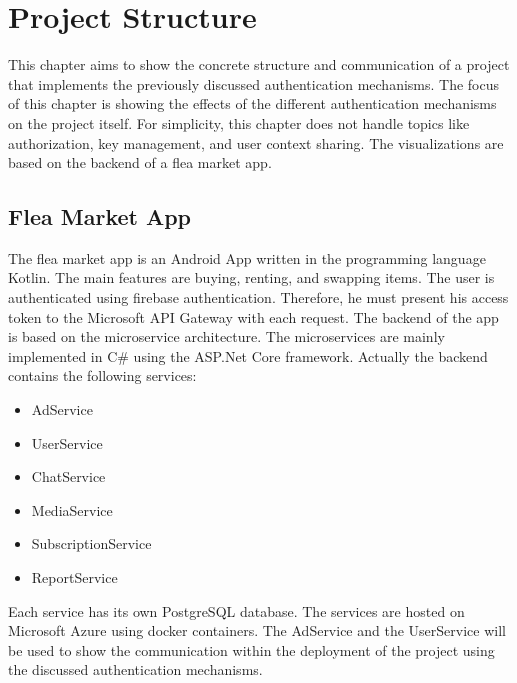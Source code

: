 \chapter{Project Structure}
\label{cha:project_structure}
This chapter aims to show the concrete structure and communication of a project that implements the previously discussed authentication mechanisms.
The focus of this chapter is showing the effects of the different authentication mechanisms on the project itself.
For simplicity, this chapter does not handle topics like authorization, key management, and user context sharing.
The visualizations are based on the backend of a flea market app.

\section{Flea Market App}
The flea market app is an Android App written in the programming language Kotlin.
The main features are buying, renting, and swapping items.
The user is authenticated using firebase authentication.
Therefore, he must present his access token to the Microsoft API Gateway with each request.
The backend of the app is based on the microservice architecture.
The microservices are mainly implemented in C\# using the ASP.Net Core framework.
Actually the backend contains the following services:
\begin{itemize}
	\item AdService
	\item UserService
	\item ChatService
	\item MediaService
	\item SubscriptionService
	\item ReportService
\end{itemize}
Each service has its own PostgreSQL database.
The services are hosted on Microsoft Azure using docker containers.
The AdService and the UserService will be used to show the communication within the deployment of the project using the discussed authentication mechanisms.


